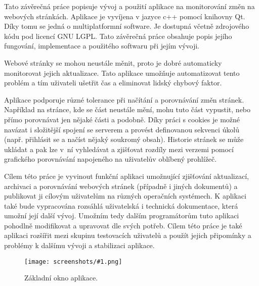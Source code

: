


\def\obrazek#1#2#3{
	\begin{figure}[tbhp]
  \centering
	{#1}
	\caption{{#2}}
  \label{fig:#3}
\end{figure}
	}
\def\obr#1#2{\obrazek{\texttt{[image: screenshots/\#1.png]}}{#2}{#1}}
\def\obrsize#1#2#3{\obrazek{\texttt{[image: screenshots/\#1.png]}}{#2}{#1}}
\def\,{\penalty10000\hskip.25em}
\pagestyle{headings}

\bakalarska






{Tato závěrečná práce popisuje vývoj a použití aplikace na monitorování změn na webových stránkách.
Aplikace je vyvíjena v jazyce c++ pomocí knihovny Qt. Díky tomu se jedná o multiplatformní software.
Je dostupná včetně zdrojového kódu pod licencí GNU LGPL. Tato závěrečná práce obsahuje popis jejího fungování, implementace a použitého softwaru při jejím vývoji.}

\obsah


Webové stránky se mohou neustále měnit, proto je dobré automaticky monitorovat jejich aktualizace.
Tato aplikace umožňuje automatizovat tento problém a tím uživateli ušetřit čas a eliminovat lidský chybový faktor.

Aplikace podporuje různé tolerance při načítání a porovnávání změn stránek.
Například na stránce, kde se část neustále mění, mohu tuto část vypustit, nebo přímo porovnávat jen nějaké části a podobně. Díky práci s cookies je možné navázat i složitější spojení se serverem a provést definovanou sekvenci úkolů (např. přihlásit se a načíst nějaký soukromý obsah). Historie stránek se může ukládat a pak lze v~ní vyhledávat a zjišťovat rozdíly mezi verzemi pomocí grafického porovnávání napojeného na uživatelův oblíbený prohlížeč.


Cílem této práce je vyvinout funkční aplikaci umožnující zjišťování aktualizací, archivaci a porovnávání webových stránek (případně i jiných dokumentů) a publikovat ji cílovým uživatelům na různých operačních systémech.
K aplikaci také bude vypracována rozsáhlá uživatelská i technická dokumentace, která umožní její další vývoj.
Umožním tedy dalším programátorům tuto aplikaci pohodlně modifikovat a upravovat dle svých potřeb.
Cílem této práce je také aplikaci rozšířit mezi skupinu testovacích uživatelů a použít jejich připomínky a problémy k dalšímu vývoji a stabilizaci aplikace.
\obr{basic_app_small}{Základní okno aplikace.}


